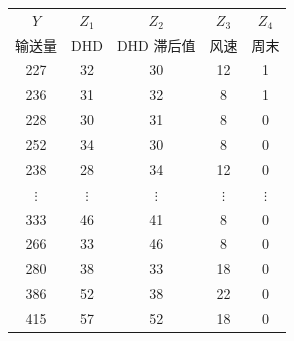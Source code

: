 \begin{mvtable}
\label{tab:7.4}
\begin{tabular}{ccccc}
\toprule
$Y$ & $Z_1$ & $Z_2$ & $Z_3$ & $Z_4$ \\
输送量 & DHD & DHD 滞后值 & 风速 & 周末 \\
\midrule
227 & 32 & 30 & 12 & 1 \\
236 & 31 & 32 & 8 & 1 \\
228 & 30 & 31 & 8 & 0 \\
252 & 34 & 30 & 8 & 0 \\
238 & 28 & 34 & 12 & 0 \\
$\vdots$ & $\vdots$ & $\vdots$ & $\vdots$ & $\vdots$ \\
333 & 46 & 41 & 8 & 0 \\
266 & 33 & 46 & 8 & 0 \\
280 & 38 & 33 & 18 & 0 \\
386 & 52 & 38 & 22 & 0 \\
415 & 57 & 52 & 18 & 0 \\
\bottomrule
\end{tabular}
\end{mvtable}

